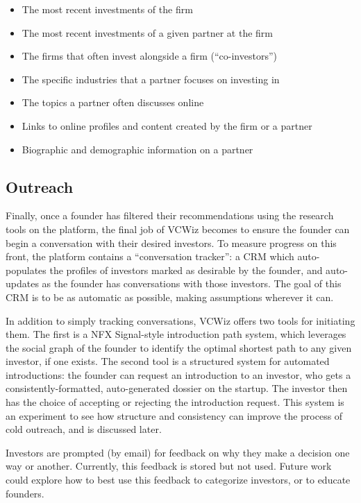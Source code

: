 \begin{itemize}
  \item The most recent investments of the firm
  \item The most recent investments of a given partner at the firm
  \item The firms that often invest alongside a firm (``co-investors'')
  \item The specific industries that a partner focuses on investing in
  \item The topics a partner often discusses online
  \item Links to online profiles and content created by the firm or a partner
  \item Biographic and demographic information on a partner
\end{itemize}

\subsection{Outreach}

Finally, once a founder has filtered their recommendations using the research tools on the platform, the final job of VCWiz becomes to ensure the founder can begin a conversation with their desired investors. To measure progress on this front, the platform contains a ``conversation tracker'': a CRM which auto-populates the profiles of investors marked as desirable by the founder, and auto-updates as the founder has conversations with those investors. The goal of this CRM is to be as automatic as possible, making assumptions wherever it can.

In addition to simply tracking conversations, VCWiz offers two tools for initiating them. The first is a NFX Signal-style introduction path system, which leverages the social graph of the founder to identify the optimal shortest path to any given investor, if one exists. The second tool is a structured system for automated introductions: the founder can request an introduction to an investor, who gets a consistently-formatted, auto-generated dossier on the startup. The investor then has the choice of accepting or rejecting the introduction request. This system is an experiment to see how structure and consistency can improve the process of cold outreach, and is discussed later.

Investors are prompted (by email) for feedback on why they make a decision one way or another. Currently, this feedback is stored but not used. Future work could explore how to best use this feedback to categorize investors, or to educate founders.

